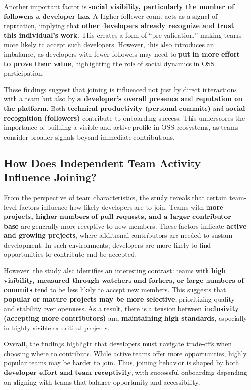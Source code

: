 Another important factor is \textbf{social visibility, particularly the number of followers a developer has}. A higher follower count acts as a signal of reputation, implying that \textbf{other developers already recognize and trust this individual’s work}. This creates a form of “pre-validation,” making teams more likely to accept such developers. However, this also introduces an imbalance, as developers with fewer followers may need to \textbf{put in more effort to prove their value}, highlighting the role of social dynamics in OSS participation.

These findings suggest that joining is influenced not just by direct interactions with a team but also by \textbf{a developer’s overall presence and reputation on the platform}. Both \textbf{technical productivity (personal commits)} and \textbf{social recognition (followers)} contribute to onboarding success. This underscores the importance of building a visible and active profile in OSS ecosystems, as teams consider broader signals beyond immediate contributions.

\subsection{How Does Independent Team Activity Influence Joining?}
From the perspective of team characteristics, the study reveals that certain team-level factors influence how likely developers are to join. Teams with \textbf{more projects, higher numbers of pull requests, and a larger contributor base} are generally more receptive to new members. These factors indicate \textbf{active and growing projects}, where additional contributors are needed to sustain development. In such environments, developers are more likely to find opportunities to contribute and be accepted.

However, the study also identifies an interesting contrast: teams with \textbf{high visibility, measured through watchers and forkers, or large numbers of commits} tend to be less likely to accept new members. This suggests that \textbf{popular or mature projects may be more selective}, prioritizing quality and stability over openness. As a result, there is a tension between \textbf{inclusivity (accepting more contributors)} and \textbf{maintaining high standards}, especially in highly visible or critical projects.

Overall, the findings highlight that developers must navigate trade-offs when choosing where to contribute. While active teams offer more opportunities, highly popular teams may be harder to join. Thus, joining behavior is shaped by both \textbf{developer effort and team receptivity}, with successful onboarding depending on aligning with teams that balance opportunity and accessibility.

